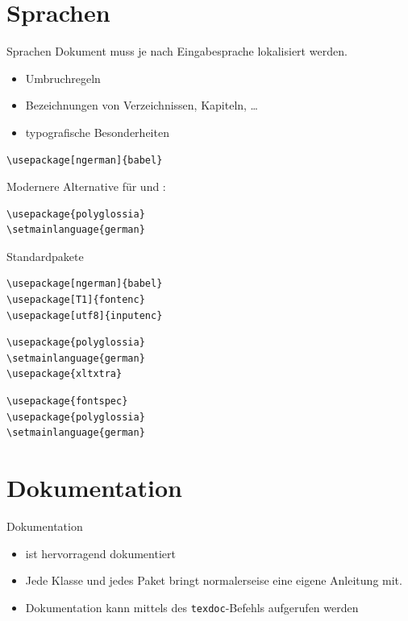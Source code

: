 \documentclass[
	vorläufig=true,
	datum=2016-10-28,
	titel={Allgemeine Formatierung und Pakete},
	web=false,
]{../tex/latexkurs-slides}
\begin{document}
\section{Sprachen}
\begin{frame}[fragile]{Sprachen}
Dokument muss je nach Eingabesprache lokalisiert werden.
\begin{itemize}
	\item Umbruchregeln
	\item Bezeichnungen von Verzeichnissen, Kapiteln, …
	\item typografische Besonderheiten
\end{itemize}
\begin{lstlisting}
\usepackage[ngerman]{babel}
\end{lstlisting}
\pause
\vfill
Modernere Alternative für  und \XeLaTeX:
\begin{lstlisting}
\usepackage{polyglossia}
\setmainlanguage{german}
\end{lstlisting}
\end{frame}


\begin{frame}[fragile]{Standardpakete}
\begin{lstlisting}
\usepackage[ngerman]{babel}
\usepackage[T1]{fontenc}
\usepackage[utf8]{inputenc}
\end{lstlisting}
\vfill
\XeLaTeX {}
\begin{lstlisting}
\usepackage{polyglossia}
\setmainlanguage{german}
\usepackage{xltxtra}
\end{lstlisting}
\vfill
{}
\begin{lstlisting}
\usepackage{fontspec}
\usepackage{polyglossia}
\setmainlanguage{german}
\end{lstlisting}
\end{frame}

\section{Dokumentation}
\begin{frame}{Dokumentation}
	\begin{itemize}
		\item {} ist hervorragend dokumentiert
		\item Jede Klasse und jedes Paket bringt normalerseise eine eigene Anleitung mit.
		\item Dokumentation kann mittels des \texttt{texdoc}-Befehls aufgerufen werden
	\end{itemize}
\end{frame}
\end{document}
